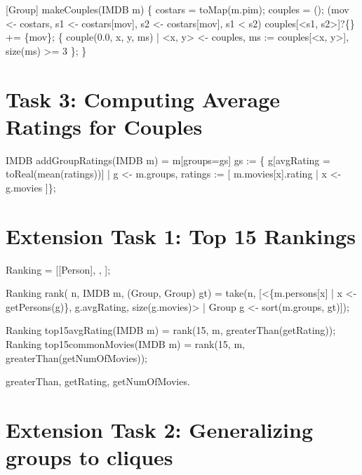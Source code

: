 \documentclass[submission,copyright,creativecommons]{eptcs}
\begin{document}
\begin{rascal}
[Group] makeCouples(IMDB m) \{{}
    costars = toMap(m.pim); couples = ();
     (mov \textless{}- costars, s1 \textless{}- costars{}[mov], s2 \textless{}- costars{}[mov], s1 \textless{} s2) 
       couples{}[\textless{}s1, s2\textgreater{}]?\{\} += \{{}mov\}{};
     \{{} couple(0.0, x, y, ms) 
                     | \textless{}x, y\textgreater{} \textless{}- couples, ms := couples{}[\textless{}x, y\textgreater{}], size(ms) \textgreater{}= 3 \}{};
\}{}
\end{rascal}

\section{Task 3: Computing Average Ratings for Couples}

\begin{rascal}
IMDB addGroupRatings(IMDB m) = m{}[groups=gs]
   gs :=
    \{{} g{}[avgRating = toReal(mean(ratings))] 
       | g \textless{}- m.groups, ratings := {}[ m.movies{}[x].rating | x \textless{}- g.movies ]\}{};
\end{rascal}

\section{Extension Task 1: Top 15 Rankings}

\begin{rascal}
 Ranking = [[Person], , ]; 

Ranking rank( n, IMDB m, (Group, Group) gt) =
    take(n, 
       {}[\textless{}\{{}m.persons{}[x] | x \textless{}- getPersons(g)\}{}, g.avgRating, size(g.movies)\textgreater{} 
            | Group g \textless{}- sort(m.groups, gt)]);
\end{rascal}    


\begin{rascal}
Ranking top15avgRating(IMDB m)    = rank(15, m, greaterThan(getRating));    
Ranking top15commonMovies(IMDB m) = rank(15, m, greaterThan(getNumOfMovies));
\end{rascal}

greaterThan, getRating, getNumOfMovies.

\section{Extension Task 2: Generalizing groups to cliques}
\end{document}
